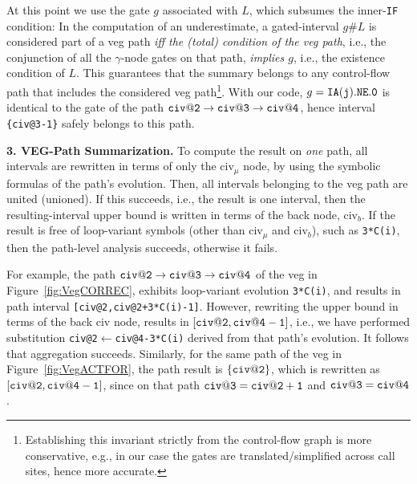 \documentclass{sig-alternate}
\begin{document}
At this point we use the gate $g$ associated with $L$, which subsumes the
inner-{\tt IF} condition: In the computation
of an underestimate, a gated-interval $g\#L$ is considered part of a 
{\sc veg} path {\em iff the (total) condition of the {\sc veg} path}, i.e., 
the conjunction of all the $\gamma$-node gates on that path, {\em implies $g$}, 
i.e., the existence condition of $L$.  This guarantees that the summary belongs
to any control-flow path that includes the considered {\sc veg} path\footnote{
Establishing this invariant strictly from the control-flow graph is more
conservative, e.g., in our case the gates are translated/simplified across call sites,
hence more accurate.
}.
With our code, $g={\tt IA(j).NE.0}$ is identical to the gate of the path 
${\tt civ@2}\rightarrow{\tt civ@3}\rightarrow{\tt civ@4}$,
hence interval {\tt \{civ@3-1\}} safely belongs to this path.


\enlargethispage{\baselineskip}

\vspace{1ex}

{\bf 3. VEG-Path Summarization.} 
%
To compute the result on {\em one} path, all intervals are rewritten in terms of only the
{\sc civ}$_\mu$ node, by using the symbolic formulas of the path's evolution.
Then, all intervals belonging to the {\sc veg} path are united (unioned). 
If this succeeds, i.e., the result is one interval, then the resulting-interval upper 
bound is written in terms of the back node, {\sc civ}$_b$. If the result is free of
loop-variant symbols (other than {\sc civ}$_\mu$ and  {\sc civ}$_b$), such as {\tt 3*C(i)},
then the path-level analysis succeeds, otherwise it fails.

For example, the path ${\tt civ@2}\rightarrow{\tt civ@3}\rightarrow{\tt civ@4}$ 
of the {\sc veg} in Figure~\ref{fig:VegCORREC}, exhibits loop-variant evolution 
{\tt 3*C(i)}, and results in path interval {\tt [civ@2,civ@2+3*C(i)-1]}. 
%
However, rewriting the upper bound in terms of the back %
{\sc civ} node, results in $[{\tt civ@2},{\tt civ@4-1}]$,
i.e., we have performed substitution {\tt civ@2$\leftarrow$civ@4-3*C(i)}
derived from that path's evolution.
It follows that aggregation succeeds.
%
Similarly, for the same path of the {\sc veg} in  Figure~\ref{fig:VegACTFOR}, the
path result is $\{{\tt civ@2}\}$, which is rewritten as
 $[{\tt civ@2}, {\tt civ@4-1}]$, since on that path 
${\tt civ@3}={\tt civ@2+1}$
and ${\tt civ@3}={\tt civ@4}$.
\end{document}
